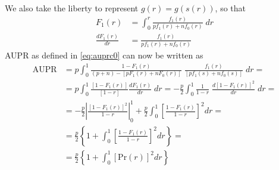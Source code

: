 We also take the liberty to represent $g(r) = g(s(r))$, so that
\begin{align}
    F_1(r) &= \int_0^r \frac{f_1(r)}{pf_1(r) + nf_0(r)} \; dr\\
    \frac{d F_1(r)}{dr} &= \frac{f_1(r)}{pf_1(r) + nf_0(r)}
\end{align}
%
AUPR as defined in \autoref{eq:auprc0} can now be written as
%
\begin{align}
    \text{AUPR}
    &= p \int_{0}^{1}
        \frac{1 - F_1(r)}{(p+n) - [pF_1(r) + nF_0(r)]}
        \; \frac{f_1(r)}{[pf_1(s) + nf_0(s)]}
    \;dr
    =\nonumber\\ &
    = p \int_{0}^{1}
        \frac{[1 - F_1(r)]}{[1 - r]}\frac{d F_1(r)}{dr}
    \;dr
    = -\frac{p}{2} \int_{0}^{1}
        \frac{1}{1 - r}
        \; \frac{d [1 - F_1(r)]^2}{dr}
    \;dr
    =\nonumber\\ &
    =
    - \frac{p}{2}
    \left|
        \frac{[1 - F_1(r)]^2}{1 - r}
    \right|_0^1
    + \frac{p}{2}
    \int_{0}^{1}
        \left[\frac{1 - F_1(r)}{1 - r}\right]^2
    dr
    =\nonumber\\ &
    =
    \frac{p}{2}
    \left\{
        1 + \int_0^1 \left[\frac{1 - F_1(r)}{1 - r}\right]^2 dr
    \right\}
    =\nonumber\\ &
    =
    \frac{p}{2}
    \left\{
        1 + \int_0^1 [\text{Pr}(r)]^2 dr
    \right\}
    \label{eq:aupr ranks}
\end{align}
%
%
